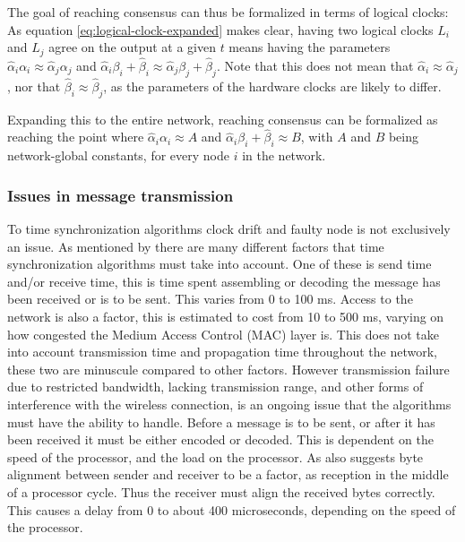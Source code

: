 \documentclass[a4paper,12pt]{article}
\begin{document}
The goal of reaching consensus can thus be formalized in terms of logical clocks: As equation \ref{eq:logical-clock-expanded} makes clear, having two logical clocks $L_i$ and $L_j$ agree on the output at a given $t$ means having the parameters $\hat\alpha_i \alpha_i \approx \hat\alpha_j \alpha_j$ and $\hat\alpha_i \beta_i + \hat\beta_i \approx \hat\alpha_j \beta_j + \hat\beta_j$. Note that this does not mean that $\hat\alpha_i \approx \hat\alpha_j$, nor that $\hat\beta_i \approx \hat\beta_j$, as the parameters of the hardware clocks are likely to differ.

Expanding this to the entire network, reaching consensus can be formalized as reaching the point where $\hat\alpha_i \alpha_i \approx A$ and $\hat\alpha_i \beta_i + \hat\beta_i \approx B$, with $A$ and $B$ being network-global constants, for every node $i$ in the network. \citep{LucaFiorentin11}

\subsubsection{Issues in message transmission} 

To time synchronization algorithms clock drift and faulty node is not exclusively an issue. As mentioned by \cite{Maroti04,Sundararaman05} there are many different factors that time synchronization algorithms must take into account. One of these is send time and/or receive time, this is time spent assembling or decoding the message has been received or is to be sent. This varies from 0 to 100 ms. Access to the network is also a factor, this is estimated to cost from 10 to 500 ms, varying on how congested the Medium Access Control (MAC) layer is. This does not take into account transmission time and propagation time throughout the network, these two are minuscule compared to other factors. However transmission failure due to restricted bandwidth, lacking transmission range, and other forms of interference with the wireless connection, is an ongoing issue that the algorithms must have the ability to handle. Before a message is to be sent, or after it has been received it must be either encoded or decoded. This is dependent on the speed of the processor, and the load on the processor. As \cite{Maroti04} also suggests byte alignment between sender and receiver to be a factor, as reception in the middle of a processor cycle. Thus the receiver must align the received bytes correctly. This causes a delay from 0 to about 400 microseconds, depending on the speed of the processor.
\end{document}
